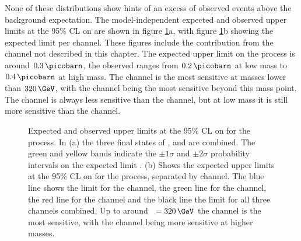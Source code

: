 None of these distributions show hints of an excess of observed events above the background expectation. 
The model-independent expected and observed upper limits at the 95\% \ac{CL}
on \xsbr are shown in 
figure \ref{fig:hhh_results_modelindep}a, with figure \ref{fig:hhh_results_modelindep}b 
showing the expected limit per channel. These figures include the contribution from the 
\tautau channel not described in this chapter. The expected upper limit
on the \Htohhtobbtautau process is around $0.3\,\picobarn$, the observed ranges
from $0.2\,\picobarn$ at low mass to $0.4\,\picobarn$ at high mass. 
The \mutau channel is the most sensitive at masses lower than $320\,\GeV$, with 
the \tautau channel being the most sensitive beyond this mass point. The \etau channel is always
less sensitive than the \mutau channel, but at low mass it is still more sensitive than the \tautau 
channel.

\begin{figure}[h!]
\begin{center}
\caption[Expected and observed upper limits at the 95\% CL on 
\xsbr for the \Htohhtobbtautau process.]{Expected and observed upper limits at the 95\% \ac{CL} on \xsbr  
for the \Htohhtobbtautau process. In (a) the three final states of \etau, \mutau and \tautau are combined. The green and yellow bands indicate the $\pm 1 \sigma $ and $\pm 2\sigma$ 
probability intervals on the expected limit  \cite{CMS-HIG-14-034}.
(b) Shows the expected upper limits at the 95\% \ac{CL} on \xsbr for the \Htohhtobbtautau
process, separated by channel. The blue line shows the limit for the \tautau channel, the green line for the \mutau channel, the red line
for the \etau channel and the black line the limit for all three channels combined. Up to around \mH~$= 320\,\GeV$ the \mutau channel is the most
sensitive, with the \tautau channel being more sensitive at higher masses.}
\label{fig:hhh_results_modelindep}
\end{center}
\end{figure}

